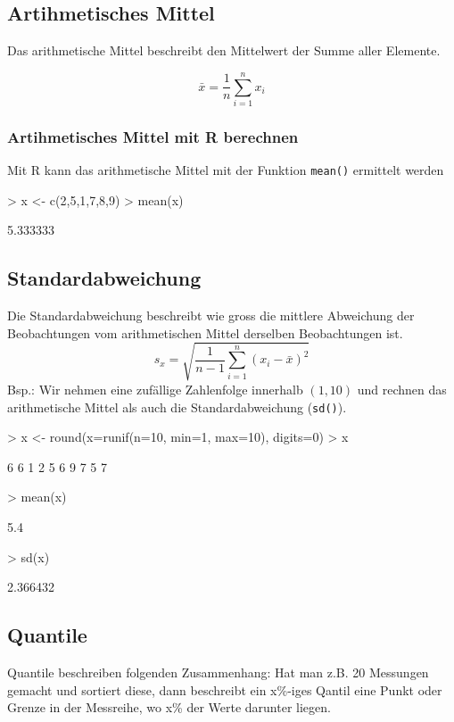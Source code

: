 \subsection{Artihmetisches Mittel}
Das arithmetische Mittel beschreibt den Mittelwert der Summe aller Elemente.

\[ \bar{x} = \frac{1}{n} \sum\limits_{i=1}^{n} x_i \]

\subsubsection{Artihmetisches Mittel mit R berechnen}
Mit R kann das arithmetische Mittel mit der Funktion \verb!mean()! 
ermittelt werden
\begin{Schunk}
\begin{Sinput}
> x <- c(2,5,1,7,8,9)
> mean(x)
\end{Sinput}
\begin{Soutput}
[1] 5.333333
\end{Soutput}
\end{Schunk}

\subsection{Standardabweichung}
Die Standardabweichung beschreibt wie gross die mittlere Abweichung der
Beobachtungen vom arithmetischen Mittel derselben Beobachtungen ist.
\[ s_x = \sqrt{ \frac{1}{n-1} \sum\limits_{i=1}^{n} (x_i - \bar{x})^2 } \]
Bsp.: Wir nehmen eine zufällige Zahlenfolge innerhalb $(1,10)$ und
rechnen das arithmetische Mittel als auch die Standardabweichung (\verb!sd()!).
\begin{Schunk}
\begin{Sinput}
> x <- round(x=runif(n=10, min=1, max=10), digits=0)
> x
\end{Sinput}
\begin{Soutput}
 [1] 6 6 1 2 5 6 9 7 5 7
\end{Soutput}
\begin{Sinput}
> mean(x)
\end{Sinput}
\begin{Soutput}
[1] 5.4
\end{Soutput}
\begin{Sinput}
> sd(x)
\end{Sinput}
\begin{Soutput}
[1] 2.366432
\end{Soutput}
\end{Schunk}

\subsection{Quantile}
Quantile beschreiben folgenden Zusammenhang: Hat man z.B. 20 Messungen gemacht
und sortiert diese, dann beschreibt ein x\%-iges Qantil eine Punkt oder Grenze
in der Messreihe, wo x\% der Werte darunter liegen.

